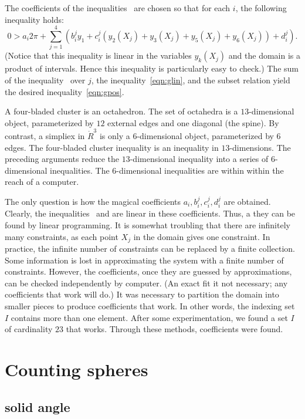 The coefficients of the inequalities~
are chosen so that for each $i$, the following inequality holds:
\begin{equation}\label{eqn:glin}
0 > a_i 2\pi + \sum_{j=1}^4 (b_i^j y_1 +  c_i^j (y_2(X_j)+y_3(X_j)+y_5(X_j)+y_6(X_j)) + d_i^j).
\end{equation}
(Notice that this inequality is linear in the variables $y_k(X_j)$ and the domain is a product of intervals.  Hence this inequality is particularly easy to check.)
The sum of the inequality~ over $j$, the inequality~\ref{eqn:glin}, and the subset relation yield the desired inequality~\ref{eqn:gpos}.

A four-bladed cluster is an octahedron.  The set of octahedra is a $13$-dimensional object, parameterized by $12$ external edges and one diagonal (the spine).   By contrast, a simpliex in $\ring{R}^3$ is only a $6$-dimensional object, parameterized by $6$ edges.
The four-bladed cluster inequality is an inequality in $13$-dimensions.
The preceding arguments reduce the $13$-dimensional inequality into a series of $6$-dimensional inequalities.   The $6$-dimensional inequalities are within within the reach of  a computer.

The only question is how the magical coefficients $a_i,b_i^j,c_i^j,d_i^j$ are obtained.  Clearly, the inequalities~ and  are linear in these coefficients.  Thus, a they can be found by linear programming.   It is somewhat troubling that there are infinitely many constraints, as each point $X_j$ in the domain gives one constraint.  In practice, the infinite number of constraints can be replaced by a finite collection.  Some information is lost in approximating the system with a finite number of constraints.  However, the coefficients, once they are guessed by approximations, can be checked independently by computer.  (An exact fit it not necessary; any coefficients that work will do.)  
It was necessary to partition the domain into smaller pieces to produce coefficients that work.  In other words, the indexing set $I$ contains more than one element.   After some experimentation, we found a set $I$ of cardinality $23$ that works.
Through these methods, coefficients were found.


\section{Counting spheres}


\subsection{solid angle}
%
%


